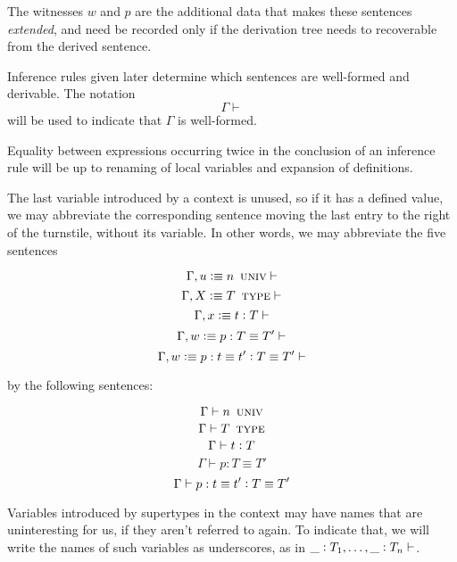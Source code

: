 \documentclass[11pt]{article}
\newcommand{\eqd}{\equiv}
\newcommand{\ccolon}{\vcentcolon}
\newcommand{\ccheck}{\vcentcolon}            %
\newcommand{\csynth}{\vcentcolon\vcentcolon} %
\renewcommand{\csynth}{\ccheck}              %
\newcommand{\Univ}{\mathop{\text{ \sc univ}}}
\newcommand{\Type}{\mathop{\text{ \sc type}}}
\newcommand{\Okay}{\mathop{\text{ \sc okay}}}
\newcommand{\Context}{\vdash\Okay}
\renewcommand{\Context}{\vdash}
\newcommand{\var}{\char`_}
\newcommand{\defn}{\vcentcolon\equiv}
\begin{document}
The witnesses $w$ and $p$ are the additional data that makes these sentences
{\em extended}, and need be recorded only if the derivation tree needs to
recoverable from the derived sentence.

Inference rules given later determine which sentences are well-formed and
derivable.  The notation $$\Gamma \Context$$ will be used to indicate that
$\Gamma$ is well-formed.

Equality between expressions occurring twice in the conclusion of an inference
rule will be up to renaming of local variables and expansion of definitions.

The last variable introduced by a context is unused, so if it has a defined
value, we may abbreviate the corresponding sentence moving the last entry to
the right of the turnstile, without its variable.  In other words, we may
abbreviate the five sentences

$$ \Gamma, u \defn n \Univ \Context $$
$$ \Gamma, X \defn T \Type \Context $$
$$ \Gamma, x \defn t \ccolon T \Context $$
$$ \Gamma, w \defn p : T \eqd T' \Context $$
$$ \Gamma, w \defn p : t \eqd t' \ccolon T \eqd T' \Context $$

by the following sentences:

$$ \Gamma \vdash n \Univ $$
$$ \Gamma \vdash T \Type $$
$$ \Gamma \vdash t \ccolon T $$
$$ \Gamma \vdash p : T \eqd T' $$
$$ \Gamma \vdash p : t \eqd t' \ccolon T \eqd T' $$

Variables introduced by supertypes in the context may have names that are
uninteresting for us, if they aren't referred to again.  To indicate that, we
will write the names of such variables as underscores, as in $\var
\ccolon T_1,\dots,\var \ccolon T_n\Context$.





\end{document}
